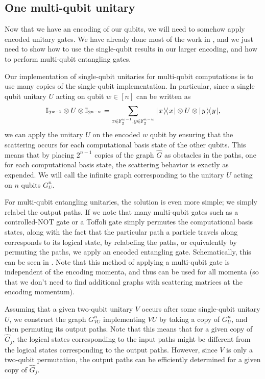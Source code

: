 \documentclass[../thesis-main/thesis-main]{subfiles}
\begin{document}

\subsection{One multi-qubit unitary}\label{sec:multi_qubit_single_gate}

Now that we have an encoding of our qubits, we will need to somehow apply encoded unitary gates.  We have already done most of the work in , and we just need to show how to use the single-qubit results in our larger encoding, and how to perform multi-qubit entangling gates.

Our implementation of single-qubit unitaries for multi-qubit computations is to use many copies of the single-qubit implementation.  In particular, since a single qubit unitary $U$ acting on qubit $w\in [n]$ can be written as
\begin{align}
  \mathbb{I}_{2^{w-1}} \otimes U \otimes \mathbb{I}_{2^{n-w}} = \sum_{x \in \mathbb{F}_2^{w-1}, y\in \mathbb{F}_2^{n-w}} |\mspace{2mu} x \mspace{2mu} \rangle\mspace{-2mu}\langle\mspace{2mu} x \mspace{2mu} | \otimes U \otimes |\mspace{2mu} y \mspace{2mu} \rangle\mspace{-2mu}\langle\mspace{2mu} y \mspace{2mu} |,
\end{align}
we can apply the unitary $U$ on the encoded $w$ qubit by ensuring that the scattering occurs for each computational basis state of the other qubits.  This means that by placing $2^{n-1}$ copies of the graph $\widehat{G}$ as obstacles in the paths, one for each computational basis state, the scattering behavior is exactly as expended.  We will call the infinite graph corresponding to the unitary $U$ acting on $n$ qubits $G_U^n$.



For multi-qubit entangling unitaries, the solution is even more simple; we simply relabel the output paths.  If we note that many multi-qubit gates such as a controlled-NOT gate or a Toffoli gate simply permutes the computational basis states, along with the fact that the particular path a particle travels along corresponds to its logical state, by relabeling the paths, or equivalently by permuting the paths, we apply an encoded entangling gate.  Schematically, this can be seen in .  Note that this method of applying a multi-qubit gate is independent of the encoding momenta, and thus can be used for all momenta (so that we don't need to find additional graphs with scattering matrices at the encoding momentum).  

Assuming that a given two-qubit unitary $V$ occurs after some single-qubit unitary $U$, we construct the graph $G_{VU}^n$ implementing $VU$ by taking a copy of $G_U^n$, and then permuting its output paths.  Note that this means that for a given copy of $\widehat{G}_j$, the logical states corresponding to the input paths might be different from the logical states corresponding to the output paths.  However, since $V$ is only a two-qubit permutation, the output paths can be efficiently determined for a given copy of $\widehat{G}_j$.
\end{document}
